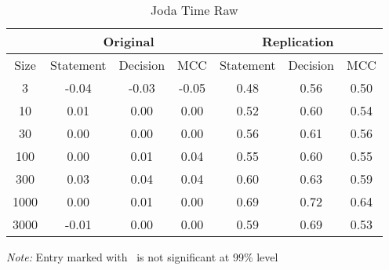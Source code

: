 \begin{table}[h]
	\caption{Joda Time Raw}
	\label{tab:jodaraw}
	\begin{minipage}{0.7\columnwidth}
		\begin{center}
			\begin{tabular}{cccc|ccc}
				\toprule
				& \multicolumn{3}{c}{Original} & \multicolumn{3}{c}{Replication} \\
				\hline
				Size & Statement & Decision & MCC & Statement & Decision & MCC  \\
				\hline
				3   & -0.04\textborn & -0.03\textborn & -0.05\textborn & 0.48 & 0.56 & 0.50\\
				10  & 0.01\textborn & 0.00\textborn & 0.00\textborn & 0.52 & 0.60 & 0.54\\
				30  & 0.00\textborn & 0.00\textborn & 0.00\textborn & 0.56  & 0.61  & 0.56 \\
				100 & 0.00\textborn & 0.01\textborn & 0.04\textborn & 0.55  & 0.60  & 0.55 \\
				300 & 0.03\textborn & 0.04\textborn & 0.04\textborn & 0.60  & 0.63  & 0.59 \\
				1000 & 0.00\textborn & 0.01\textborn & 0.00\textborn & 0.69  & 0.72 & 0.64 \\
				3000 & -0.01\textborn & 0.00\textborn & 0.00\textborn & 0.59 & 0.69 & 0.53 \\
				\bottomrule
			\end{tabular}
		\end{center}
		\bigskip
		\emph{Note:} Entry marked with \textborn~is not significant at 99\% level
	\end{minipage}
\end{table}

